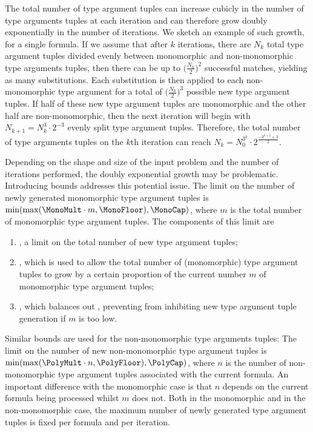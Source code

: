 \documentclass[runningheads]{llncs}
\begin{document}
The total number of type argument tuples can increase cubicly in the number of type arguments tuples at each iteration and can therefore grow doubly exponentially in the number of iterations. We sketch an example of such growth, for a single formula. If we assume that after \(k\) iterations, there are \(N_k\) total type argument tuples divided evenly between monomorphic and non-monomorphic type arguments tuples, then there can be up to \(\bigl(\frac{N_k}{2}\bigr)^2\) successful matches, yielding as many substitutions. Each substitution is then applied to each non-monomorphic type argument for a total of \(\bigl(\frac{N_k}{2}\bigr)^3\) possible new type argument tuples. If half of these new type argument tuples are monomorphic and the other half are non-monomorphic, then the next iteration will begin with \(N_{k+1} = N_k^3 \cdot 2^{-3}\) evenly split type argument tuples. Therefore, the total number of type arguments tuples on the \(k\)th iteration can reach \(N_k = N_0^{3^k} \cdot 2^{\frac{-3^{k+2}+3}{2}}\).

   Depending on the shape and size of the input problem and the number of iterations performed, the doubly exponential growth may be problematic. Introducing bounds addresses this potential issue. The limit on the number of newly generated monomorphic type argument tuples is \(\min(\max(\MonoMult\cdot m, \MonoFloor), \MonoCap)\), where \(m\) is the total number of monomorphic type argument tuples. The components of this limit are
\begin{enumerate}
   \item \MonoCap, a %
   limit on the total number of new type argument tuples;
   \item \MonoMult, which is used to allow the total number of (monomorphic) type argument tuples to grow by a certain proportion of the current number \(m\) of monomorphic type argument tuples;
   \item \MonoFloor, which balances out \MonoMult, preventing \MonoMult from inhibiting new type argument tuple generation if \(m\) is too low.
\end{enumerate}

Similar bounds are used for the non-monomorphic type arguments tuples:
The limit on the number of new non-monomorphic type argument tuples is \(\min(\max(\PolyMult\cdot n, \PolyFloor),\allowbreak \PolyCap)\), where \(n\) is the number of non-monomorphic type argument tuples associated with the current formula. An important difference with the monomorphic case is that \(n\) depends on the current formula being processed whilst \(m\) does not.
Both in the monomorphic and in the non-monomorphic case, the maximum number of newly generated type argument tuples is fixed per formula and per iteration.
\end{document}
